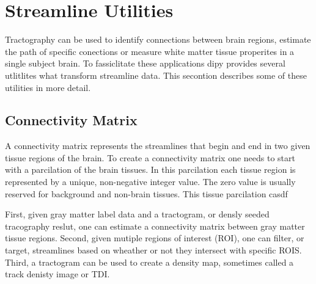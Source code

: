 \section{Streamline Utilities}

Tractography can be used to identify connections between brain regions, estimate the path of specific conections or measure white matter tissue properites in a single subject brain. To fassiclitate these applications dipy provides several utlitlites what transform streamline data. This secontion describes some of these utilities in more detail.

\subsection{Connectivity Matrix}
A connectivity matrix represents the streamlines that begin and end in two given tissue regions of the brain. To create a connectivity matrix one needs to start with a parcilation of the brain tissues. In this parcilation each tissue region is represented by a unique, non-negative integer value. The zero value is usually reserved for background and non-brain tissues. This tissue parcilation casdf 

First, given gray matter label data and a tractogram, or densly seeded tracography reslut, one can estimate a connectivity matrix between gray matter tissue regions. Second, given mutiple regions of interest (ROI), one can filter, or target, streamlines based on wheather or not they intersect with specific ROIS. Third, a tractogram can be used to create a density map, sometimes called a track denisty image or TDI. 
